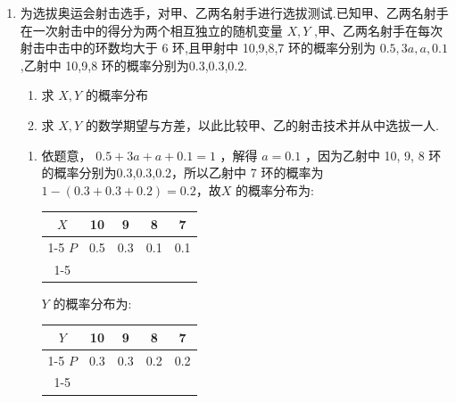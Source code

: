 \begin{enumerate}
\begin{enumerate}
\begin{jieda}
\begin{enumerate}
                $D\left( Y\right)  = 3 \times  \dfrac{2}{3} \times  \left( {1 - \dfrac{2}{3}}\right)  = \dfrac{2}{3}$
                
                因为 $E\left( X\right)  = E\left( Y\right)$ ,所以甲乙两人实力相当,
                
                而 $D\left( X\right)  < D\left( Y\right)$ ,甲比乙更稳定,因此派甲去较为合适.
            \end{enumerate}
        \end{jieda}
        \item 为选拔奥运会射击选手，对甲、乙两名射手进行选拔测试.已知甲、乙两名射手在一次射击中的得分为两个相互独立的随机变量 $X,Y$ ,甲、乙两名射手在每次射击中击中的环数均大于 6 环,且甲射中 10,9,8,7 环的概率分别为 ${0.5},{3a},a,{0.1}$ ,乙射中 10,9,8 环的概率分别为0.3,0.3,0.2.
        \begin{enumerate}
            \item 求 $X,Y$ 的概率分布
            \item 求 $X,Y$ 的数学期望与方差，以此比较甲、乙的射击技术并从中选拔一人.
        \end{enumerate}
        \begin{jieda}
            \begin{enumerate}
                \item 依题意， ${0.5} + {3a} + a + {0.1} = 1$ ，解得 $a = {0.1}$ ，因为乙射中 10, 9, 8 环的概率分别为0.3,0.3,0.2，所以乙射中 7 环的概率为 $1 - \left( {{0.3} + {0.3} + {0.2}}\right)  = {0.2}$，故$X$ 的概率分布为:
                
                \begin{center}
                
                \begin{tabular}{|c|c|c|c|c|}
                \hline
                $X$ & 10 & 9 & 8 & 7 \\
                \cline{1-5}
                $P$ & 0.5 & 0.3 & 0.1 & 0.1 \\
                \cline{1-5}
                \hline
                \end{tabular}
                
                \end{center}
                
                $Y$ 的概率分布为:
                
                \begin{center}
                
                \begin{tabular}{|c|c|c|c|c|}
                \hline
                $Y$ & 10 & 9 & 8 & 7 \\
                \cline{1-5}
                $P$ & 0.3 & 0.3 & 0.2 & 0.2 \\
                \cline{1-5}
                \hline
                \end{tabular}
                

\end{center}
\end{enumerate}
\end{jieda}
\end{enumerate}
\end{enumerate}
